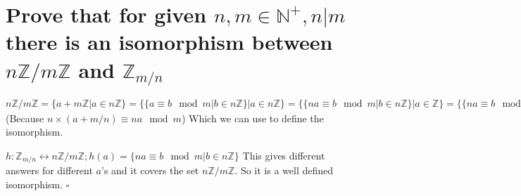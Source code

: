 \documentclass[11pt]{article}
\begin{document}
    \part*{Prove that for given $n, m \in \mathbb{N^+}, n | m$ there is an isomorphism between $n\mathbb{Z}/m\mathbb{Z}$ and $\mathbb{Z}_{m/n}$ }

    $n\mathbb{Z}/m\mathbb{Z} = \{a + m\mathbb{Z} | a \in n\mathbb{Z}\} = \{\{a \equiv b \mod m | b \in n\mathbb{Z}\} | a \in n\mathbb{Z}\} = \{\{na \equiv b \mod m | b \in n\mathbb{Z}\} | a \in \mathbb{Z}\} = \{\{na \equiv b \mod m | b \in n\mathbb{Z}\} | a \in \mathbb{Z}_{m/n}\}$ (Because $n \times (a + m/n) \equiv na \mod m$) Which we can use to define the isomorphism.

    $h: \mathbb{Z}_{m/n} \leftrightarrow n\mathbb{Z}/m\mathbb{Z}; h(a) = \{na \equiv b \mod m | b \in n\mathbb{Z}\}$ This gives different answers for different $a$'s and it covers the set $n\mathbb{Z}/m\mathbb{Z}$. So it is a well defined isomorphism. $\square$
\end{document}
